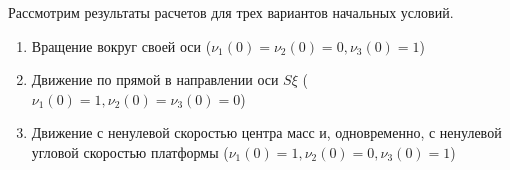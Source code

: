 Рассмотрим результаты расчетов для трех вариантов начальных условий.
\begin{enumerate}[wide]
    \item \label{sol:self_rot} Вращение вокруг своей оси ($\nu_1(0) = \nu_2(0) = 0, \nu_3(0) = 1$)
    \item \label{sol:straight} Движение по прямой в направлении оси $S\xi$ ($\nu_1(0) = 1, \nu_2(0) = \nu_3(0) = 0$)
    \item \label{sol:wrench} Движение с ненулевой скоростью центра масс и, одновременно, с ненулевой угловой скоростью платформы ($\nu_1(0) = 1, \nu_2(0) = 0, \nu_3(0) = 1$)
\end{enumerate}



